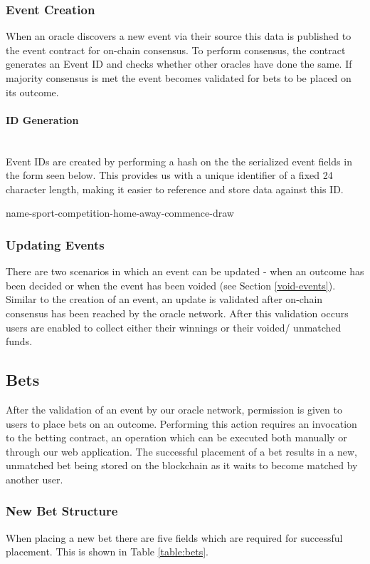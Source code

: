 \documentclass{article}
\newcommand{\myparagraph}[1]{\paragraph{#1}\mbox{}\\ \newline}
\begin{document}
		\subsubsection{Event Creation} \label{event-creation}
When an oracle discovers a new event via their source this data is published to the event contract for on-chain consensus. To perform consensus, the contract generates an Event ID and checks whether other oracles have done the same. If majority consensus is met the event becomes validated for bets to be placed on its outcome.

			\myparagraph{ID Generation} \label{id-generation}
Event IDs are created by performing a hash on the the serialized event fields in the form seen below. This provides us with a unique identifier of a fixed 24 character length, making it easier to reference and store data against this ID.


\begin{center}
name-sport-competition-home-away-commence-draw
\end{center}

		\subsubsection{Updating Events} \label{updating-events}
There are two scenarios in which an event can be updated - when an outcome has been decided or when the event has been voided (see Section \ref{void-events}). Similar to the creation of an event, an update is validated after on-chain consensus has been reached by the oracle network. After this validation occurs users are enabled to collect either their winnings or their voided/ unmatched funds.


	\subsection{Bets} \label{bets}
	After the validation of an event by our oracle network, permission is given to users to place bets on an outcome. Performing this action requires an invocation to the betting contract, an operation which can be executed both manually or through our web application. The successful placement of a bet results in a new, unmatched bet being stored on the blockchain as it waits to become matched by another user.

		\subsubsection{New Bet Structure} \label{new-bet-structure}
When placing a new bet there are five fields which are required for successful placement. This is shown in Table \ref{table:bets}.
\end{document}
